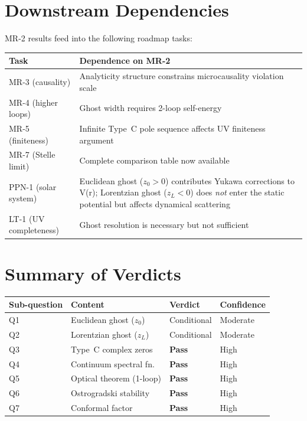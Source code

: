 \documentclass[11pt,a4paper]{article}
\begin{document}
\section{Downstream Dependencies}
\label{sec:downstream}

MR-2 results feed into the following roadmap tasks:

\begin{center}
\begin{tabular}{lp{8cm}}
\toprule
Task & Dependence on MR-2 \\
\midrule
MR-3 (causality) & Analyticity structure constrains microcausality
  violation scale \\
MR-4 (higher loops) & Ghost width requires 2-loop self-energy \\
MR-5 (finiteness) & Infinite Type~C pole sequence affects UV
  finiteness argument \\
MR-7 (Stelle limit) & Complete comparison table now available \\
PPN-1 (solar system) & Euclidean ghost ($z_0 > 0$) contributes Yukawa
  corrections to V(r); Lorentzian ghost ($z_L < 0$) does \emph{not}
  enter the static potential but affects dynamical scattering \\
LT-1 (UV completeness) & Ghost resolution is necessary but not
  sufficient \\
\bottomrule
\end{tabular}
\end{center}


\section{Summary of Verdicts}
\label{sec:summary}

\begin{center}
\begin{tabular}{llll}
\toprule
Sub-question & Content & Verdict & Confidence \\
\midrule
Q1 & Euclidean ghost ($z_0$) & Conditional & Moderate \\
Q2 & Lorentzian ghost ($z_L$) & Conditional & Moderate \\
Q3 & Type~C complex zeros & \textbf{Pass} & High \\
Q4 & Continuum spectral fn.\ & \textbf{Pass} & High \\
Q5 & Optical theorem (1-loop) & \textbf{Pass} & High \\
Q6 & Ostrogradski stability & \textbf{Pass} & High \\
Q7 & Conformal factor & \textbf{Pass} & High \\
\bottomrule
\end{tabular}
\end{center}
\end{document}
